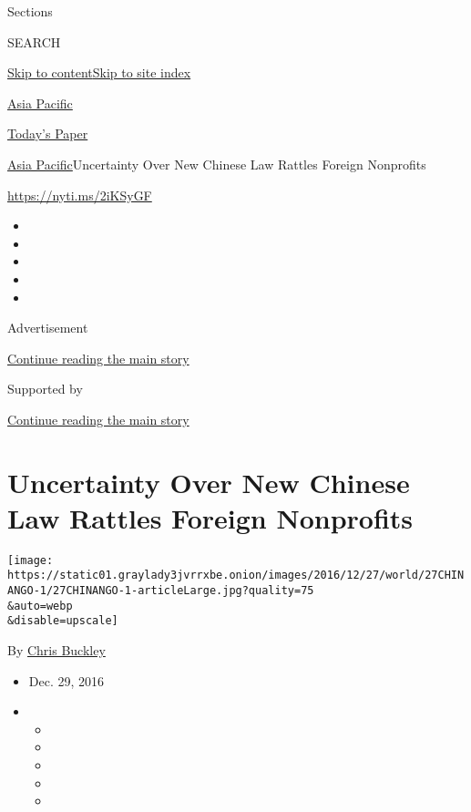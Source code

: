 Sections

SEARCH

\protect\hyperlink{site-content}{Skip to
content}\protect\hyperlink{site-index}{Skip to site index}

\href{https://www.nytimes3xbfgragh.onion/section/world/asia}{Asia
Pacific}

\href{https://myaccount.nytimes3xbfgragh.onion/auth/login?response_type=cookie\&client_id=vi}{}

\href{https://www.nytimes3xbfgragh.onion/section/todayspaper}{Today's
Paper}

\href{/section/world/asia}{Asia Pacific}\textbar{}Uncertainty Over New
Chinese Law Rattles Foreign Nonprofits

\url{https://nyti.ms/2iKSyGF}

\begin{itemize}
\item
\item
\item
\item
\item
\end{itemize}

Advertisement

\protect\hyperlink{after-top}{Continue reading the main story}

Supported by

\protect\hyperlink{after-sponsor}{Continue reading the main story}

\hypertarget{uncertainty-over-new-chinese-law-rattles-foreign-nonprofits}{%
\section{Uncertainty Over New Chinese Law Rattles Foreign
Nonprofits}\label{uncertainty-over-new-chinese-law-rattles-foreign-nonprofits}}

\texttt{[image: https://static01.graylady3jvrrxbe.onion/images/2016/12/27/world/27CHINANGO-1/27CHINANGO-1-articleLarge.jpg?quality=75\\\&auto=webp\\\&disable=upscale]}

By \href{http://www.nytimes3xbfgragh.onion/by/chris-buckley}{Chris
Buckley}

\begin{itemize}
\item
  Dec. 29, 2016
\item
  \begin{itemize}
  \item
  \item
  \item
  \item
  \item
  \end{itemize}
\end{itemize}

